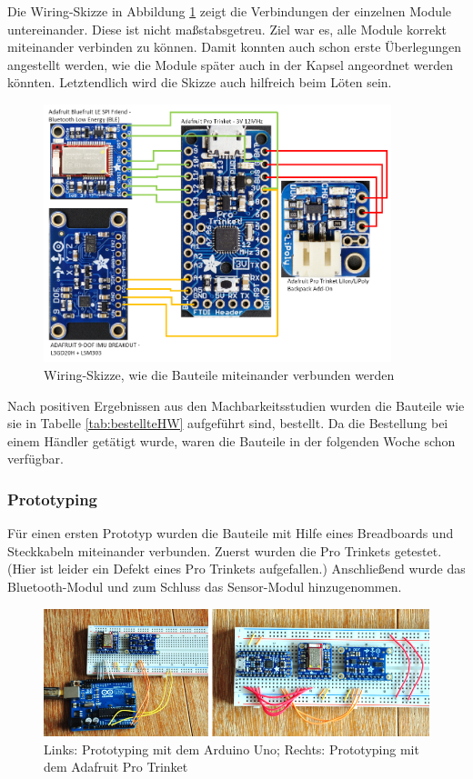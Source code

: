 Die Wiring-Skizze in Abbildung \ref{fig:k3_wiringskizze} zeigt die Verbindungen der einzelnen Module untereinander. Diese ist nicht maßstabsgetreu. Ziel war es, alle Module korrekt miteinander verbinden zu können. Damit konnten auch schon erste Überlegungen angestellt werden, wie die Module später auch in der Kapsel angeordnet werden könnten. Letztendlich wird die Skizze auch hilfreich beim Löten sein.

\begin{figure}[h]
	\centering
	\includegraphics[width=0.9\textwidth]{images/k3-wiringskizze.PNG}
	\caption {Wiring-Skizze, wie die Bauteile miteinander verbunden werden}
	\label{fig:k3_wiringskizze}
\end{figure}

Nach positiven Ergebnissen aus den Machbarkeitsstudien wurden die Bauteile wie sie in Tabelle \ref{tab:bestellteHW} aufgeführt sind, bestellt. Da die Bestellung bei einem Händler getätigt wurde, waren die Bauteile in der folgenden Woche schon verfügbar.
\newpage

\subsubsection{Prototyping}

Für einen ersten Prototyp wurden die Bauteile mit Hilfe eines Breadboards und Steckkabeln miteinander verbunden. Zuerst wurden die Pro Trinkets getestet. (Hier ist leider ein Defekt eines Pro Trinkets aufgefallen.) Anschließend wurde das Bluetooth-Modul und zum Schluss das Sensor-Modul hinzugenommen.

\begin{figure}[h]
	\centering
	\includegraphics[width=1\textwidth]{images/k3-prototyping.PNG}
	\caption {Links: Prototyping mit dem Arduino Uno; Rechts: Prototyping mit dem Adafruit Pro
		Trinket}
	\label{fig:k3_prototyping}
\end{figure}

